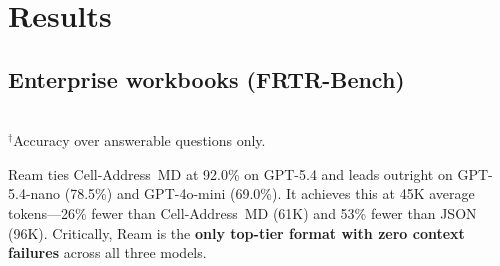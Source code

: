 \documentclass[11pt]{article}
\begin{document}
\section{Results}
\label{sec:results}

\subsection{Enterprise workbooks (FRTR-Bench)}

\begin{table}[t]
\centering
\caption{FRTR-Bench accuracy (\%) on 200~enterprise questions. ``Err'' = context-length failures on GPT-4o-mini. Sorted by GPT-5.4.}
\label{tab:frtr-results}
\\[2pt]
\footnotesize{$^\dagger$Accuracy over answerable questions only.}
\end{table}

Ream ties Cell-Address~MD at 92.0\% on GPT-5.4 and leads outright on GPT-5.4-nano (78.5\%) and GPT-4o-mini (69.0\%).
It achieves this at 45K average tokens---26\% fewer than Cell-Address~MD (61K) and 53\% fewer than JSON (96K).
Critically, Ream is the \textbf{only top-tier format with zero context failures} across all three models.
\end{document}
